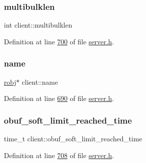 \mbox{\label{structclient_aecec921a67d8d2524164737d4a8f1467}} 
\subsubsection{\texorpdfstring{multibulklen}{multibulklen}}
{\footnotesize\ttfamily int client\+::multibulklen}



Definition at line \hyperlink{server_8h_source_l00700}{700} of file \hyperlink{server_8h_source}{server.\+h}.

\mbox{\label{structclient_a1568127243d6a623540c7ebe78317a5c}} 
\subsubsection{\texorpdfstring{name}{name}}
{\footnotesize\ttfamily \hyperlink{structredisObject}{robj}$\ast$ client\+::name}



Definition at line \hyperlink{server_8h_source_l00690}{690} of file \hyperlink{server_8h_source}{server.\+h}.

\mbox{\label{structclient_a4fabe12fb4bd7194b041c765ad0f75aa}} 
\subsubsection{\texorpdfstring{obuf\+\_\+soft\+\_\+limit\+\_\+reached\+\_\+time}{obuf\_soft\_limit\_reached\_time}}
{\footnotesize\ttfamily time\+\_\+t client\+::obuf\+\_\+soft\+\_\+limit\+\_\+reached\+\_\+time}



Definition at line \hyperlink{server_8h_source_l00708}{708} of file \hyperlink{server_8h_source}{server.\+h}.

\mbox{\label{structclient_a6edab5d6742ec650d28f2952d46953bb}} 
